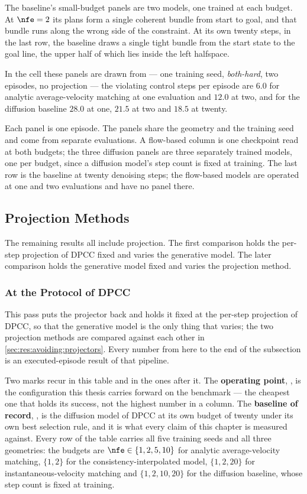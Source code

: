 The baseline's small-budget panels are two models, one trained at each budget. At $\nfe=2$ its plans
form a single coherent bundle from start to goal, and that bundle runs along the wrong side of the
constraint. At its own twenty steps, in the last row, the baseline draws a single tight bundle from the
start state to the goal line, the upper half of which lies inside the left halfspace.

In the cell these panels are drawn from --- one training seed, \emph{both-hard}, two episodes, no
projection --- the violating control steps per episode are $6.0$ for analytic average-velocity matching at one evaluation and $12.0$ at two, and for the
diffusion baseline $28.0$ at one, $21.5$ at two and $18.5$ at twenty.

Each panel is one episode. The panels share the geometry and the training seed and come from separate
evaluations. A flow-based column is one checkpoint read at both budgets; the three diffusion panels are
three separately trained models, one per budget, since a diffusion model's step count is fixed at
training. The last row is the baseline at twenty denoising steps; the flow-based models are operated at
one and two evaluations and have no panel there.

\subsection{Projection Methods}\label{sec:res:avoiding:projection}

The remaining results all include projection. The first comparison holds the per-step projection of
\ac{DPCC} fixed and varies the generative model. The later comparison holds the generative model fixed
and varies the projection method.

\subsubsection{At the Protocol of DPCC}\label{sec:res:avoiding:dpccprotocol}\label{sec:res:fewstep}

This pass puts the projector back and holds it fixed at the per-step projection of \ac{DPCC}, so that
the generative model is the only thing that varies; the two projection methods are compared against
each other in \autoref{sec:res:avoiding:projectors}. Every number from here to the end of the
subsection is an executed-episode result of that pipeline.

Two marks recur in this table and in the ones after it. The \textbf{operating point}, \selectedmark, is
the configuration this thesis carries forward on the benchmark --- the cheapest one that holds its
success, not the highest number in a column. The \textbf{baseline of record}, \baselinemark, is the
diffusion model of \ac{DPCC} at its own budget of twenty under its own best selection rule, and it is
what every claim of this chapter is measured against. Every row of the table carries all five training
seeds and all three geometries: the budgets are $\nfe\in\{1,2,5,10\}$ for analytic average-velocity
matching, $\{1,2\}$ for the consistency-interpolated model, $\{1,2,20\}$ for instantaneous-velocity
matching and $\{1,2,10,20\}$ for the diffusion baseline, whose step count is fixed at training.


